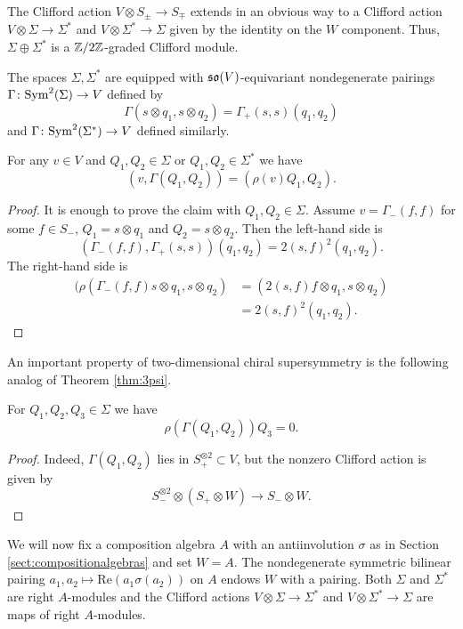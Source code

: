 \documentclass[10pt, oneside]{article}
\renewcommand{\Re}{\mathrm{Re}}
\begin{document}
The Clifford action $V\otimes S_{\pm}\rightarrow S_{\mp}$ extends in an obvious way to a Clifford action $V\otimes \Sigma\rightarrow \Sigma^*$ and $V\otimes \Sigma^*\rightarrow \Sigma$ given by the identity on the $W$ component. Thus, $\Sigma\oplus \Sigma^*$ is a $\mathbb Z/2\mathbb Z$-graded Clifford module.

The spaces $\Sigma, \Sigma^*$ are equipped with $\mathfrak{so}(V)$-equivariant nondegenerate pairings $\Gamma\colon {\rm Sym}^2(\Sigma)\rightarrow V$ defined by
\[\Gamma(s\otimes q_1, s\otimes q_2) = \Gamma_+(s, s) (q_1, q_2)\]
and $\Gamma\colon {\rm Sym}^2(\Sigma^*)\rightarrow V$ defined similarly.

\begin{prop}
For any $v\in V$ and $Q_1, Q_2\in\Sigma$ or $Q_1, Q_2\in\Sigma^*$ we have
\[(v, \Gamma(Q_1, Q_2)) = (\rho(v) Q_1, Q_2).\]
\end{prop}
\begin{proof}
It is enough to prove the claim with $Q_1, Q_2\in\Sigma$. Assume $v = \Gamma_-(f, f)$ for some $f\in S_-$, $Q_1 = s\otimes q_1$ and $Q_2 = s\otimes q_2$. Then the left-hand side is
\[(\Gamma_-(f, f), \Gamma_+(s, s)) (q_1, q_2) = 2(s, f)^2 (q_1, q_2).\]
The right-hand side is
\begin{align*}
(\rho(\Gamma_-(f, f) s\otimes q_1, s\otimes q_2) &= (2(s, f) f\otimes q_1, s\otimes q_2) \\
&= 2(s, f)^2 (q_1, q_2).
\end{align*}
\end{proof}

An important property of two-dimensional chiral supersymmetry is the following analog of Theorem \ref{thm:3psi}.

\begin{thm}
For $Q_1, Q_2, Q_3\in\Sigma$ we have
\[\rho(\Gamma(Q_1, Q_2))Q_3 = 0.\]
\label{thm:2d3psi}
\end{thm}
\begin{proof}
Indeed, $\Gamma(Q_1, Q_2)$ lies in $S_+^{\otimes 2}\subset V$, but the nonzero Clifford action is given by
\[S_-^{\otimes 2}\otimes (S_+\otimes W)\longrightarrow S_-\otimes W.\]
\end{proof}

We will now fix a composition algebra $A$ with an antiinvolution $\sigma$ as in Section \ref{sect:compositionalgebras} and set $W = A$. The nondegenerate symmetric bilinear pairing $a_1, a_2\mapsto \Re(a_1\sigma(a_2))$ on $A$ endows $W$ with a pairing. Both $\Sigma$ and $\Sigma^*$ are right $A$-modules and the Clifford actions $V\otimes \Sigma\rightarrow \Sigma^*$ and $V\otimes \Sigma^*\rightarrow \Sigma$ are maps of right $A$-modules.
\end{document}
